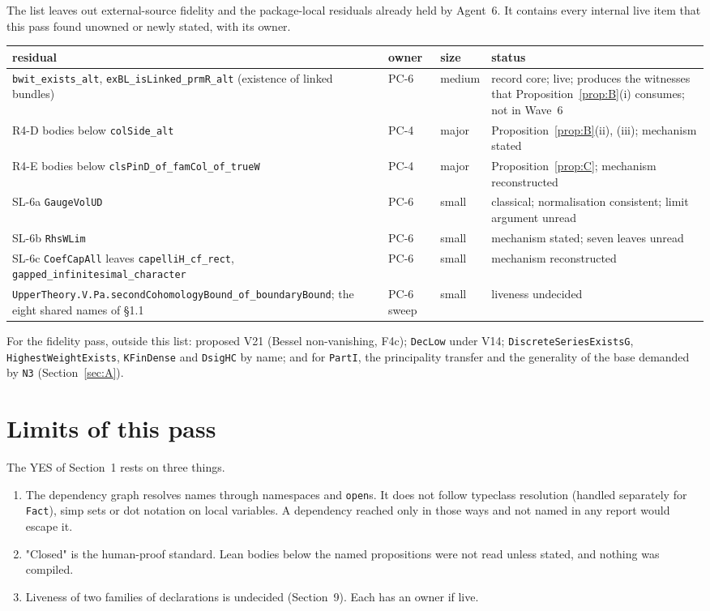 \documentclass[11pt]{article}
\newcommand{\lean}[1]{\nolinkurl{#1}}
\newcommand{\PC}[1]{PC-#1}
\theoremstyle{remark}
\begin{document}
The list leaves out external-source fidelity and the package-local residuals already held by Agent~6. It contains every internal live item that this pass found unowned or newly stated, with its owner.
\begin{center}\small
\begin{tabularx}{\textwidth}{>{\raggedright}p{4.4cm}>{\raggedright}p{1.4cm}>{\raggedright}p{1.6cm}>{\raggedright\arraybackslash}X}
\toprule
residual & owner & size & status\\
\midrule
\lean{bwit_exists_alt}, \lean{exBL_isLinked_prmR_alt} (existence of linked bundles) & \PC{6} & medium & record core; live; produces the witnesses that Proposition~\ref{prop:B}(i) consumes; not in Wave~6\\
R4-D bodies below \lean{colSide_alt} & \PC{4} & major & Proposition~\ref{prop:B}(ii), (iii); mechanism stated\\
R4-E bodies below \lean{clsPinD_of_famCol_of_trueW} & \PC{4} & major & Proposition~\ref{prop:C}; mechanism reconstructed\\
SL-6a \lean{GaugeVolUD} & \PC{6} & small & classical; normalisation consistent; limit argument unread\\
SL-6b \lean{RhsWLim} & \PC{6} & small & mechanism stated; seven leaves unread\\
SL-6c \lean{CoefCapAll} leaves \lean{capelliH_cf_rect}, \lean{gapped_infinitesimal_character} & \PC{6} & small & mechanism reconstructed\\
\lean{UpperTheory.V.Pa.secondCohomologyBound_of_boundaryBound}; the eight shared names of §1.1 & \PC{6} sweep & small & liveness undecided\\
\bottomrule
\end{tabularx}
\end{center}

For the fidelity pass, outside this list: proposed V21 (Bessel non-vanishing, F4c); \lean{DecLow} under V14; \lean{DiscreteSeriesExistsG}, \lean{HighestWeightExists}, \lean{KFinDense} and \lean{DsigHC} by name; and for \lean{PartI}, the principality transfer and the generality of the base demanded by \lean{N3} (Section~\ref{sec:A}).

\section{Limits of this pass}\label{sec:limits}

The YES of Section~1 rests on three things.
\begin{enumerate}
\item The dependency graph resolves names through namespaces and \lean{open}s. It does not follow typeclass resolution (handled separately for \lean{Fact}), simp sets or dot notation on local variables. A dependency reached only in those ways and not named in any report would escape it.
\item "Closed" is the human-proof standard. Lean bodies below the named propositions were not read unless stated, and nothing was compiled.
\item Liveness of two families of declarations is undecided (Section~9). Each has an owner if live.
\end{enumerate}
\end{document}
